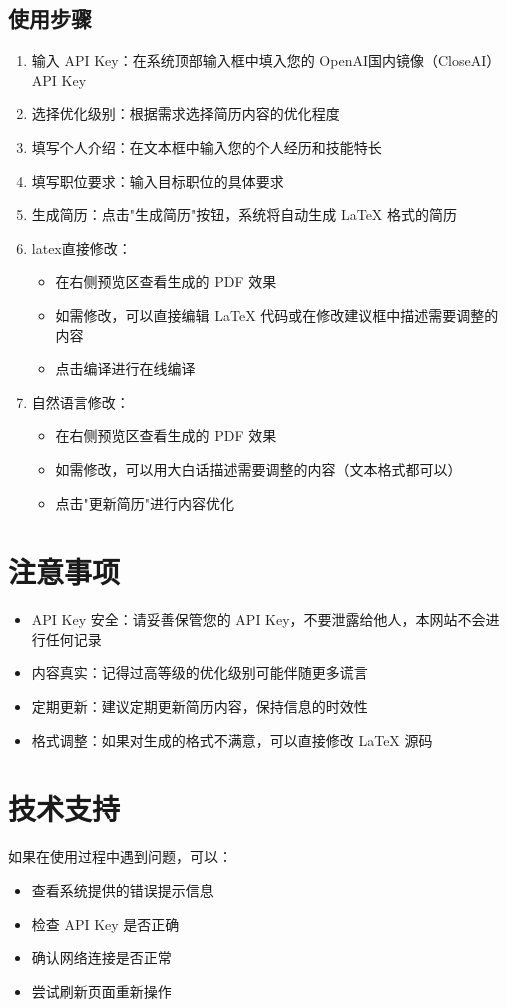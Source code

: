\documentclass{article}
\begin{document}
\subsection{使用步骤}
\begin{enumerate}
    \item 输入 API Key：在系统顶部输入框中填入您的 OpenAI国内镜像（CloseAI） API Key
    \item 选择优化级别：根据需求选择简历内容的优化程度
    \item 填写个人介绍：在文本框中输入您的个人经历和技能特长
    \item 填写职位要求：输入目标职位的具体要求
    \item 生成简历：点击"生成简历"按钮，系统将自动生成 LaTeX 格式的简历
    \item latex直接修改：
    \begin{itemize}
        \item 在右侧预览区查看生成的 PDF 效果
        \item 如需修改，可以直接编辑 LaTeX 代码或在修改建议框中描述需要调整的内容
        \item 点击编译进行在线编译
    \end{itemize}
    \item 自然语言修改：
    \begin{itemize}
        \item 在右侧预览区查看生成的 PDF 效果
        \item 如需修改，可以用大白话描述需要调整的内容（文本格式都可以）
        \item 点击"更新简历"进行内容优化
    \end{itemize}
\end{enumerate}

\section{注意事项}
\begin{itemize}
    \item API Key 安全：请妥善保管您的 API Key，不要泄露给他人，本网站不会进行任何记录
    \item 内容真实：记得过高等级的优化级别可能伴随更多谎言
    \item 定期更新：建议定期更新简历内容，保持信息的时效性
    \item 格式调整：如果对生成的格式不满意，可以直接修改 LaTeX 源码
\end{itemize}

\section{技术支持}
如果在使用过程中遇到问题，可以：
\begin{itemize}
    \item 查看系统提供的错误提示信息
    \item 检查 API Key 是否正确
    \item 确认网络连接是否正常
    \item 尝试刷新页面重新操作
\end{itemize}
\end{document}
